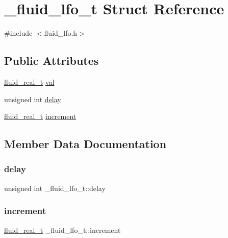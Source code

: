 \hypertarget{struct__fluid__lfo__t}{}\section{\+\_\+fluid\+\_\+lfo\+\_\+t Struct Reference}
\label{struct__fluid__lfo__t}


{\ttfamily \#include $<$fluid\+\_\+lfo.\+h$>$}

\subsection*{Public Attributes}
\begin{DoxyCompactItemize}
\item 
\hyperlink{fluidsynth__priv_8h_a9e96f0917747b69cabb7c671bc693dbb}{fluid\+\_\+real\+\_\+t} \hyperlink{struct__fluid__lfo__t_a56f1a08c37957fc3be87560d184a73b5}{val}
\item 
unsigned int \hyperlink{struct__fluid__lfo__t_aa43118e7a3a8d5155dfa93d2af589e3f}{delay}
\item 
\hyperlink{fluidsynth__priv_8h_a9e96f0917747b69cabb7c671bc693dbb}{fluid\+\_\+real\+\_\+t} \hyperlink{struct__fluid__lfo__t_a43fdfa236c0ff3bcefb32df577a8996e}{increment}
\end{DoxyCompactItemize}


\subsection{Member Data Documentation}
\mbox{\label{struct__fluid__lfo__t_aa43118e7a3a8d5155dfa93d2af589e3f}} 
\subsubsection{\texorpdfstring{delay}{delay}}
{\footnotesize\ttfamily unsigned int \+\_\+fluid\+\_\+lfo\+\_\+t\+::delay}

\mbox{\label{struct__fluid__lfo__t_a43fdfa236c0ff3bcefb32df577a8996e}} 
\subsubsection{\texorpdfstring{increment}{increment}}
{\footnotesize\ttfamily \hyperlink{fluidsynth__priv_8h_a9e96f0917747b69cabb7c671bc693dbb}{fluid\+\_\+real\+\_\+t} \+\_\+fluid\+\_\+lfo\+\_\+t\+::increment}

